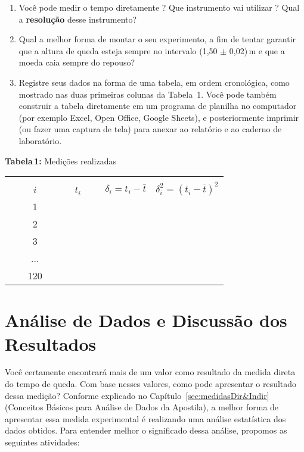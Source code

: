 \begin{enumerate}
\item Você pode medir o tempo diretamente ? Que instrumento vai utilizar ? Qual a {\bf resolução} desse instrumento?
\item Qual a melhor forma de montar o seu experimento, a fim de tentar garantir que a altura de queda esteja sempre no intervalo (1,50 $\pm$ 0,02)$\,$m e que a moeda caia sempre do repouso?

\item Registre seus dados na forma de uma tabela, em ordem cronológica, como mostrado nas duas primeiras colunas da Tabela~1. Você pode também construir a tabela diretamente em um programa de planilha no computador (por exemplo Excel, Open Office, Google Sheets), e posteriormente imprimir (ou fazer uma captura de tela) para anexar ao relatório e ao caderno de laboratório.
\end{enumerate}

\begin{center}
{{\bf Tabela\,1:} Medições realizadas}\vspace{0.2cm}

  \begin{tabular}[m]{ l | c | c | c | c |}
   \cline{2-5}
    &   & &  &  \\
    &  ~~~$i$~~~ & ~~~$t_i$~~~ & $\delta_i = t_i - \bar{t}$ & $\delta_i^2 = (t_i - \bar{t})^2$ \\\cline{2-5}
   & 1 & & & \\
   & 2 & & & \\
   & 3 & & & \\
   & ... & & & \\
    &  120& & &  \\ \cline{2-5}
  \end{tabular}
  \label{tab:Integ}
\end{center}


\section{Análise de Dados e Discussão dos Resultados}
Você certamente encontrará mais de um valor como resultado da medida direta do tempo de queda. Com base nesses valores, como pode apresentar o resultado dessa medição? Conforme explicado no %
Capítulo~\ref{sec:medidasDir&Indir}  (Conceitos Básicos para Análise de Dados da Apostila), a melhor forma de apresentar essa medida experimental é realizando uma análise estatística dos dados obtidos. Para entender melhor o significado dessa análise, propomos as seguintes atividades:


